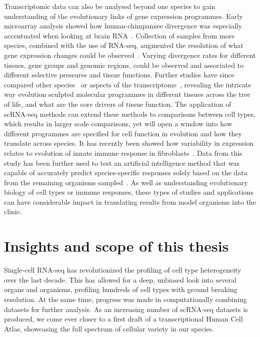 Transcriptomic data can also be analysed beyond one species to gain understanding of the evolutionary links of gene expression programmes. Early microarray analysis showed how human-chimpanzee divergence was especially accentuated when looking at brain RNA~\citep{enard_intra-_2002}. Collection of samples from more species, combined with the use of RNA-seq, augmented the resolution of what gene expression changes could be observed~\citep{brawand_evolution_2011}. Varying divergence rates for different tissues, gene groups and genomic regions, could be observed and associated to different selective pressures and tissue functions. Further studies have since compared other species~\citep{li_comparison_2014} or aspects of the transcriptome~\citep{barbosa-morais_evolutionary_2012}, revealing the intricate way evolution sculpted molecular programmes in different tissues across the tree of life, and what are the core drivers of tissue function. The application of scRNA-seq methods can extend these methods to comparisons between cell types, which results in larger scale comparisons, yet will open a window into how different programmes are specified for cell function in evolution and how they translate across species. It has recently been showed how variability in expression relates to evolution of innate immune response in fibroblasts~\citep{hagai_gene_2018}. Data from this study has been further used to test an artificial intelligence method that was capable of accurately predict species-specific responses solely based on the data from the remaining organisms sampled~\citep{lotfollahi_generative_2018}. As well as understanding evolutionary biology of cell types or immune responses, these types of studies and applications can have considerable impact in translating results from model organisms into the clinic.



\section{Insights and scope of this thesis}  %
\label{section1.6}

Single-cell RNA-seq has revolutionized the profiling of cell type heterogeneity over the last decade. This has allowed for a deep, unbiased look into several organs and organisms, profiling hundreds of cell types with ground breaking resolution. At the same time, progress was made in computationally combining datasets for further analysis. As an increasing number of scRNA-seq datasets is produced, we come ever closer to a first draft of a transcriptional Human Cell Atlas, showcasing the full spectrum of cellular variety in our species.


